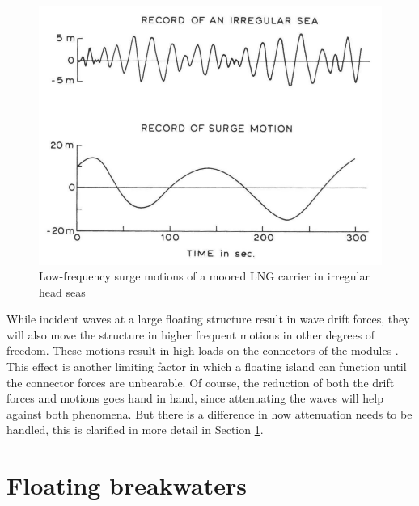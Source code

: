 \begin{figure}
    \centering
    \includegraphics[width=0.7\linewidth]{figures/Literature_Introduction/large_amplitude_low_freq_motions.PNG}
    \caption{Low-frequency surge motions of a moored LNG carrier in irregular head seas \parencite{Pinkster1980}}
    \label{fig: low freq surge motions}
\end{figure}



While incident waves at a large floating structure result in wave drift forces, they will also move the structure in higher frequent motions in other degrees of freedom. These motions result in high loads on the connectors of the modules \parencite{Isope2019}. This effect is another limiting factor in which a floating island can function until the connector forces are unbearable. Of course, the reduction of both the drift forces and motions goes hand in hand, since attenuating the waves will help against both phenomena. But there is a difference in how attenuation needs to be handled, this is clarified in more detail in Section \ref{sec: floating breakwaters}.









\section{Floating breakwaters}
\label{sec: floating breakwaters}

